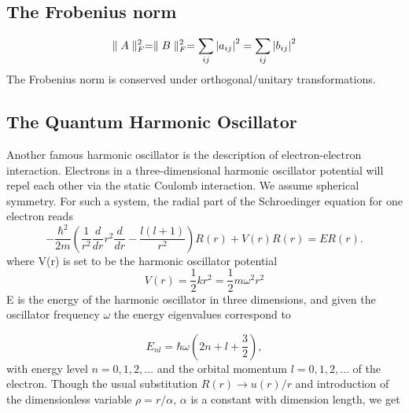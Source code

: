 \documentclass[%
reprint,
amsmath,amssymb,
aps,
]{revtex4-1}
\begin{document}
\subsection{The Frobenius norm}
\begin{equation}\label{forb}
	\parallel A \parallel_F^2 = \parallel B \parallel_F^2 = \sum_{ij} \abs{a_{ij}}^2 = \sum_{ij} \abs{b_{ij}}^2
\end{equation}
The Frobenius norm is conserved under orthogonal/unitary transformations. 


\subsection{The Quantum Harmonic Oscillator} \noindent 
Another famous harmonic oscillator is the description of electron-electron interaction. Electrons in a three-dimensional harmonic oscillator potential will repel each other via the static Coulomb interaction. We assume spherical symmetry. For such a system, the radial part of the Schroedinger equation for one electron reads
\begin{equation*}
-\frac{\hbar^2}{2 m} \left ( \frac{1}{r^2} \frac{d}{dr} r^2
\frac{d}{dr} - \frac{l (l + 1)}{r^2} \right )R(r) 
+ V(r) R(r) = E R(r).
\end{equation*}
where V(r) is set to be the harmonic oscillator potential 
\begin{equation*}
	V(r) = \dfrac{1}{2}kr^2 = \dfrac{1}{2}m\omega^2r^2
\end{equation*}
E is the energy of the harmonic oscillator in three dimensions, and given the oscillator frequency $\omega$ the energy eigenvalues correspond to 

\begin{equation*}
E_{nl}=  \hbar \omega \left(2n+l+\frac{3}{2}\right),
\end{equation*}
with energy level $n=0,1,2,\dots$ and the orbital momentum $l=0,1,2,\dots$ of the electron. Though the usual substitution $R(r) \rightarrow u(r)/r$ and introduction of the dimensionless variable $\rho = r/\alpha$, $\alpha$ is a constant with dimension length, we get
\end{document}
